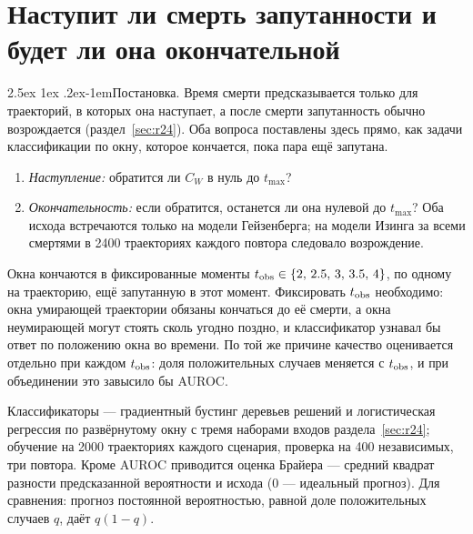 \documentclass[12pt,a4paper]{report}
\makeatletter
\renewcommand\paragraph{\@startsection{paragraph}{4}{\z@}%
  {2.5ex \@plus1ex \@minus.2ex}{-1em}{\normalfont\normalsize\bfseries}}
\numberwithin{equation}{chapter}
\makeatother
\begin{document}
\section{Наступит ли смерть запутанности и будет ли она окончательной}
\label{sec:r26}

\paragraph{Постановка.} Время смерти предсказывается только для
траекторий, в которых она наступает, а после смерти запутанность обычно
возрождается (раздел~\ref{sec:r24}). Оба вопроса поставлены здесь прямо,
как задачи классификации по окну, которое кончается, пока пара ещё
запутана.
\begin{enumerate}
\item \emph{Наступление:} обратится ли $C_W$ в нуль до $t_{\max}$?
\item \emph{Окончательность:} если обратится, останется ли она нулевой до
      $t_{\max}$? Оба исхода встречаются только на модели Гейзенберга; на
      модели Изинга за всеми смертями в 2400 траекториях каждого повтора
      следовало возрождение.
\end{enumerate}
Окна кончаются в фиксированные моменты $t_{\rm obs}\in\{2,\,2.5,\,3,\,3.5,\,4\}$,
по одному на траекторию, ещё запутанную в этот момент. Фиксировать
$t_{\rm obs}$ необходимо: окна умирающей траектории обязаны кончаться до её
смерти, а окна неумирающей могут стоять сколь угодно поздно, и
классификатор узнавал бы ответ по положению окна во времени. По той же
причине качество оценивается отдельно при каждом $t_{\rm obs}$: доля
положительных случаев меняется с $t_{\rm obs}$, и при объединении это
завысило бы AUROC.

Классификаторы --- градиентный бустинг деревьев решений и логистическая
регрессия по развёрнутому окну с тремя наборами входов
раздела~\ref{sec:r24}; обучение на 2000 траекториях каждого сценария,
проверка на 400 независимых, три повтора. Кроме AUROC приводится оценка
Брайера --- средний квадрат разности предсказанной вероятности и исхода
($0$ --- идеальный прогноз). Для сравнения: прогноз постоянной
вероятностью, равной доле положительных случаев $q$, даёт $q(1-q)$.
\end{document}
